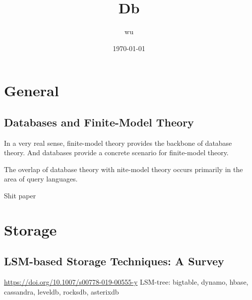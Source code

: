 \documentclass[11pt]{article}
\author{wu}
\date{\today}
\title{Db}
\begin{document}
\maketitle
\tableofcontents

\section{General}
\label{sec:org4df6460}
\subsection{Databases and Finite-Model Theory}
\label{sec:org648fcfc}
In a very real sense, finite-model theory provides the backbone of database theory. And databases
provide a concrete scenario for finite-model theory.

The overlap of database theory with nite-model theory occurs primarily in the area of query languages.

Shit paper
\section{Storage}
\label{sec:orgfc60dd4}
\subsection{LSM-based Storage Techniques: A Survey}
\label{sec:orgb4f8147}
\url{https://doi.org/10.1007/s00778-019-00555-y}
LSM-tree: bigtable, dynamo, hbase, cassandra, leveldb, rocksdb, asterixdb
\end{document}
